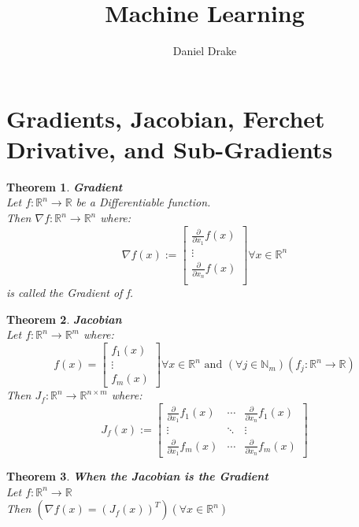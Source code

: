 \documentclass[12pt]{extarticle}
\title{Machine Learning}
\author{Daniel Drake}
\theoremstyle{plain}
\newtheorem{thm}{Theorem}[section]
\theoremstyle{Definition}
\theoremstyle{Definition}
\theoremstyle{plain}
\begin{document}
		\maketitle			
\section{Gradients, Jacobian, Ferchet Drivative, and Sub-Gradients} 
\begin{thm} \textbf{Gradient} \\ 
	Let $f : \mathbb{R}^n \to \mathbb{R}$ be a Differentiable function. \\ 
	Then $\nabla f: \mathbb{R}^n \to \mathbb{R}^n$ where: \\ 
	\[
	\nabla f(x) := 
	\begin{bmatrix}
	\frac{\partial }{\partial x_1}f(x) \\ 
	\vdots \\
	\frac{\partial }{\partial x_n}f(x) \\ 				
	\end{bmatrix}
	\forall x \in \mathbb{R}^n
	\]
	is called the Gradient of f. 
\end{thm}

\begin{thm} \textbf{Jacobian} \\ 
	Let $f : \mathbb{R}^n \to \mathbb{R}^m$ where: 
	\[
	f(x) = 
	\begin{bmatrix}
	f_1(x) \\ 
	\vdots \\ 
	f_m(x) 
	\end{bmatrix}
	\forall x \in \mathbb{R}^n \text{ and } (\forall j \in \mathbb{N}_m) (f_j : \mathbb{R}^n \to \mathbb{R}) 
	\]
	Then $J_f : \mathbb{R}^n \to \mathbb{R}^{n \times m}$ where: \\  
	\[
	J_f(x) := 
	\begin{bmatrix} 
	\frac{\partial }{\partial x_1}f_1(x) & \cdots & \frac{\partial }{\partial x_n}f_1(x) \\
	\vdots & \ddots & \vdots \\ 
	\frac{\partial }{\partial x_1}f_m(x) & \cdots & \frac{\partial }{\partial x_n}f_m(x) 
	\end{bmatrix}
	\]
\end{thm}

\begin{thm} \textbf{When the Jacobian is the Gradient} \\
	Let $f : \mathbb{R}^n \to \mathbb{R}$ \\ 
	Then $(\nabla f(x) = (J_f(x))^T) (\forall x \in \mathbb{R}^n)$ \\ 	
\end{thm}
\end{document}
